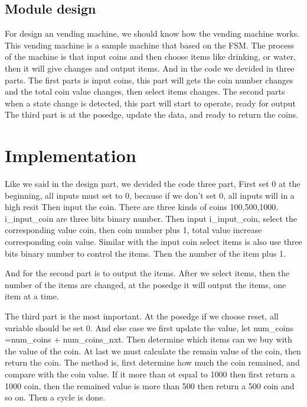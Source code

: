 \documentclass[12pt,a4paper]{article}
\begin{document}
\subsection{Module design}

For design an vending machine, we should know how the vending machine works.
This vending machine is a sample machine that based on the FSM.
The process of the machine is that input coins and then choose items like drinking, or water, then it will give changes and output items.
And in the code we devided in three parts. 
The first parts is input coins, this part will gets the coin number changes and the total coin value changes, then select items changes.
The second parts when a state change is detected, this part will start to operate, ready for output
The third part is at the posedge, update the data, and ready to return the coins. 




\newpage

\section{Implementation}

Like we said in the design part, we devided the code three part,
First set 0 at the beginning, all inputs must set to 0, because if we don't set 0, all inputs will in a high resit
Then input the coin. There are three kinds of coins 100,500,1000.
i_input_coin are three bits binary number. 
Then input i_input_coin, select the corresponding value coin, then coin number plus 1, total value increase corresponding coin value.
Similar with the input coin select items is also use three bits binary number to control the items.
Then the number of the item plus 1.

And for the second part is to output the items. 
After we select items, then the number of the items are changed, at the posedge it will output the items, one item at a time.

The third part is the most important.
At the posedge if we choose reset, all variable should be set 0.
And else case we first update the value, let num_coins =num_coins + num_coins_nxt.
Then determine which items can we buy with the value of the coin.
At last we must calculate the remain value of the coin, then return the coin.
The method is, first determine how much the coin remained, and compare with the coin value.
If it more than ot equal to 1000 then first return a 1000 coin, then the remained value is more than 500 then return a 500 coin and so on.
Then a cycle is done.  
\end{document}
